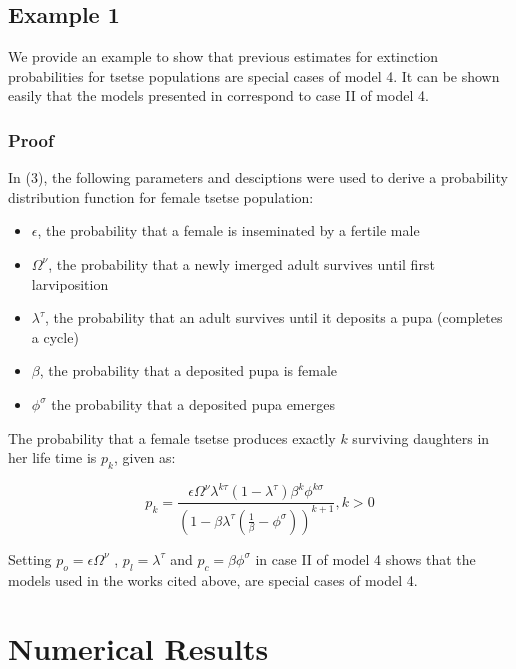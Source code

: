 \subsection{Example 1}

We provide an example to show that previous estimates for extinction probabilities for tsetse populations are special cases of model 4. It can be shown easily that the models presented in \cite{Hargrove2005a,Kajunguri2019,Are2019} correspond to case II of model 4. 

\subsubsection*{Proof}

In (3), the following parameters and desciptions were used to derive a probability distribution function for female tsetse population: 
\begin{itemize}
	\item $\epsilon$, the probability that a female is inseminated by a fertile male 
	\item $\Omega^{\nu}$,  the probability that a newly imerged adult survives until first larviposition
	\item $ \lambda^{\tau}$, the probability that an adult survives until it deposits a pupa (completes a cycle)
	\item $\beta$,  the probability that a deposited pupa is female 
	\item $\phi^{\sigma}$  the probability that a deposited pupa emerges
\end{itemize}

The probability that a female tsetse produces exactly $k$ surviving daughters in her life time is $p_{k}$, given as:

\begin{equation}
\label{Johnframework}
p_{k}= \frac{\epsilon \Omega^{\nu}\lambda^{k\tau}(1-\lambda^{\tau})\beta^{k}\phi^{k\sigma}}{(1-\beta \lambda^\tau(\frac{1}{\beta} -\phi^{\sigma}))^{k+1}},   k>0   
\end{equation}

Setting  $ p_{o}= \epsilon \Omega^{\nu}$ , $p_{l} =\lambda^{\tau} $  and $p_{c} = \beta \phi^{\sigma} $ in case II of model 4 shows that the models used in the works cited above, are special cases of model 4. 



\section{Numerical Results}

